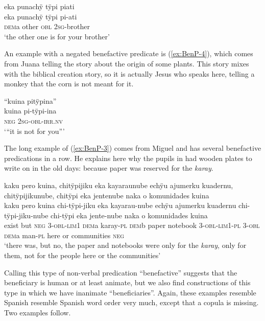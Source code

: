 \ea\label{ex:BenP-2}
\begingl
\glpreamble eka punachÿ tÿpi piati\\
\gla eka punachÿ tÿpi pi-ati\\
\glb \textsc{dem}a other \textsc{obl} 2\textsc{sg}-brother\\
\glft ‘the other one is for your brother’
\endgl
\trailingcitation{[jmx-e090727s.063]}
\xe

An example with a negated benefactive predicate is (\ref{ex:BenP-4}), which comes from Juana telling the story about the origin of some plants. This story mixes with the biblical creation story, so it is actually Jesus who speaks here, telling a monkey that the corn is not meant for it.

\ea\label{ex:BenP-4}
\begingl
\glpreamble “kuina pitÿpina”\\
\gla kuina pi-tÿpi-ina\\
\glb \textsc{neg} 2\textsc{sg}-\textsc{obl}-\textsc{irr.nv}\\
\glft ‘“it is not for you”’
\endgl
\trailingcitation{[jxx-n101013s-1.872]}
\xe

The long example of (\ref{ex:BenP-3}) comes from Miguel and has several benefactive predications in a row. He explains here why the pupils in  had wooden plates to write on in the old days: because paper was reserved for the \textit{karay}.

\ea\label{ex:BenP-3}
\begingl
\glpreamble kaku pero kuina, chitÿpijiku eka kayaraunube echÿu ajumerku kuadernu, \\chitÿpijikunube, chitÿpi eka jentenube naka o komunidades kuina\\
\gla kaku pero kuina chi-tÿpi-jiku eka kayarau-nube echÿu ajumerku kuadernu chi-tÿpi-jiku-nube chi-tÿpi eka jente-nube naka o komunidades kuina\\
\glb exist but \textsc{neg} 3-\textsc{obl}-\textsc{lim}1 \textsc{dem}a karay-\textsc{pl} \textsc{dem}b paper notebook 3-\textsc{obl}-\textsc{lim}1-\textsc{pl} 3-\textsc{obl} \textsc{dem}a man-\textsc{pl} here or communities \textsc{neg}\\
\glft ‘there was, but no, the paper and notebooks were only for the \textit{karay}, only for them, not for the people here or the communities’
\endgl
\trailingcitation{[mxx-p181027l-1.027-029]}
\xe

Calling this type of non-verbal predication “benefactive” suggests that the beneficiary is human or at least animate, but we also find constructions of this type in which we have inanimate “beneficiaries”. Again, these examples resemble Spanish resemble Spanish word order very much, except that a copula is missing. Two examples follow.


